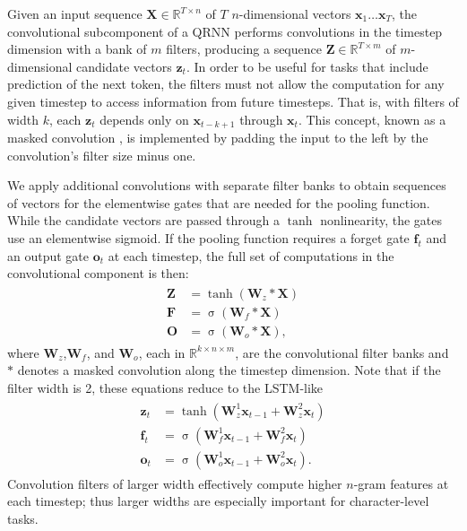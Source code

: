 \documentclass{article} \usepackage{iclr2017_conference,times}
\DeclareMathOperator*{\sigmoid}{\sigma}
\begin{document}
Given an input sequence $\mathbf{X}\in\mathbb{R}^{T\times n}$ of $T$ $n$-dimensional vectors $\mathbf{x}_1\ldots\mathbf{x}_T$, the convolutional subcomponent of a QRNN performs convolutions in the timestep dimension with a bank of $m$ filters, producing a sequence $\mathbf{Z}\in\mathbb{R}^{T\times m}$ of $m$-dimensional candidate vectors $\mathbf{z}_t$. In order to be useful for tasks that include prediction of the next token, the filters must not allow the computation for any given timestep to access information from future timesteps. That is, with filters of width $k$, each $\mathbf{z}_t$ depends only on $\mathbf{x}_{t-k+1}$ through $\mathbf{x}_t$. This concept, known as a masked convolution \citep{vandenOord2016}, is implemented by padding the input to the left by the convolution's filter size minus one.

We apply additional convolutions with separate filter banks to obtain sequences of vectors for the elementwise gates that are needed for the pooling function. While the candidate vectors are passed through a $\tanh$ nonlinearity, the gates use an elementwise sigmoid. If the pooling function requires a forget gate $\mathbf{f}_t$ and an output gate $\mathbf{o}_t$ at each timestep, the full set of computations in the convolutional component is then:
\begin{align}
\begin{split}\label{conv}
\mathbf{Z}&=\tanh(\mathbf{W}_z*\mathbf{X})\\
\mathbf{F}&=\sigmoid(\mathbf{W}_f*\mathbf{X})\\
\mathbf{O}&=\sigmoid(\mathbf{W}_o*\mathbf{X}),
\end{split}
\end{align}
where $\mathbf{W}_z$,$\mathbf{W}_f$, and $\mathbf{W}_o$, each in $\mathbb{R}^{k\times n\times m}$, are the convolutional filter banks and $*$ denotes a masked convolution along the timestep dimension. Note that if the filter width is 2, these equations reduce to the LSTM-like
\begin{align}
\begin{split}\label{lstm-like}
\mathbf{z}_t&=\tanh(\mathbf{W}^1_z\mathbf{x}_{t-1}+\mathbf{W}^2_z\mathbf{x}_t)\\
\mathbf{f}_t&=\sigmoid(\mathbf{W}^1_f\mathbf{x}_{t-1}+\mathbf{W}^2_f\mathbf{x}_t)\\
\mathbf{o}_t&=\sigmoid(\mathbf{W}^1_o\mathbf{x}_{t-1}+\mathbf{W}^2_o\mathbf{x}_t).
\end{split}
\end{align}
Convolution filters of larger width effectively compute higher $n$-gram features at each timestep; thus larger widths are especially important for character-level tasks.
\end{document}
